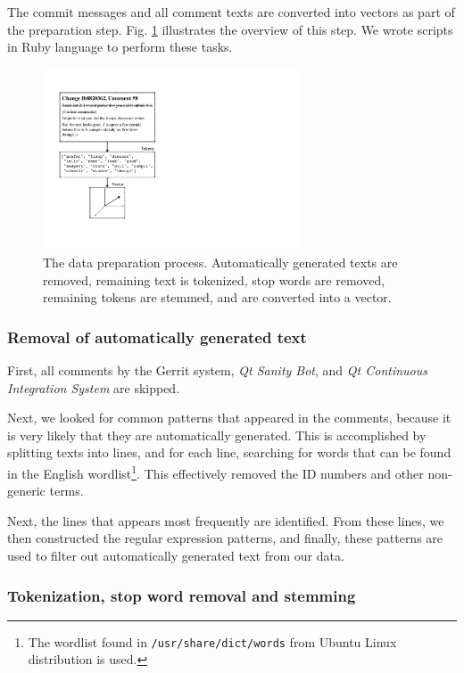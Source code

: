 \documentclass[conference]{IEEEtran}
\begin{document}
The commit messages and all comment texts are converted into vectors as part of the preparation step.
Fig. \ref{fig:preprocess} illustrates the overview of this step.
We wrote scripts in Ruby language to perform these tasks.

\begin{figure}[h]
\centering
\includegraphics[width=3in]{preprocess}
\caption{The data preparation process.
Automatically generated texts are removed, remaining text is tokenized, stop words are removed, remaining tokens are stemmed,
and are converted into a vector.}
\label{fig:preprocess}
\end{figure}

\subsubsection{Removal of automatically generated text}

First, all comments by the Gerrit system, \emph{Qt Sanity Bot}, and \emph{Qt Continuous Integration System} are skipped.

Next, we looked for common patterns that appeared in the comments, because it is very likely that they are automatically generated.
This is accomplished by splitting texts into lines, and for each line, searching for words that can be found in the English wordlist\footnote{The wordlist found in \texttt{/usr/share/dict/words} from Ubuntu Linux distribution is used.}.
This effectively removed the ID numbers and other non-generic terms.

Next, the lines that appears most frequently are identified.
From these lines, we then constructed the regular expression patterns,
and finally, these patterns are used to filter out automatically generated text from our data.

\subsubsection{Tokenization, stop word removal and stemming}
\end{document}
